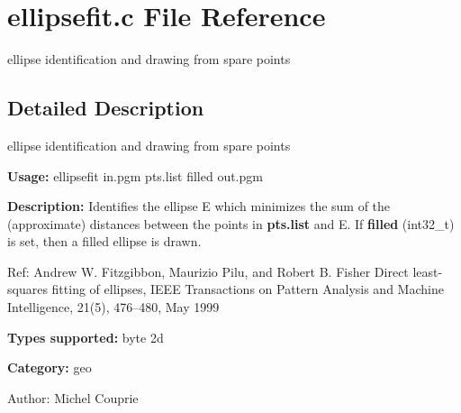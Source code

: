 \section{ellipsefit.c File Reference}
\label{ellipsefit_8c}
ellipse identification and drawing from spare points  




\label{_details}
\subsection{Detailed Description}
ellipse identification and drawing from spare points 

{\bf Usage:} ellipsefit in.pgm pts.list filled out.pgm

{\bf Description:} Identifies the ellipse E which minimizes the sum of the (approximate) distances between the points in {\bf pts.list} and E. If {\bf filled} (int32\_\-t) is set, then a filled ellipse is drawn.

Ref: Andrew W. Fitzgibbon, Maurizio Pilu, and Robert B. Fisher Direct least-squares fitting of ellipses, IEEE Transactions on Pattern Analysis and Machine Intelligence, 21(5), 476--480, May 1999

{\bf Types supported:} byte 2d

{\bf Category:} geo

\begin{Desc}
\item[Author:]Michel Couprie \end{Desc}
